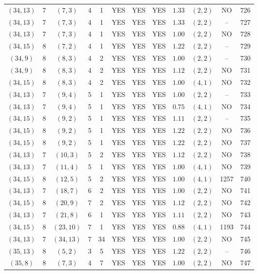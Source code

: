 \begin{longtable}{|c|c|c|c|c|c|c|c|c|c|c|c|}
$(34,13)$ & 7 & $(7,3)$ & 4 & 1 & YES & YES & YES & $1.33$ & $(2,2)$ & NO & 726\\
$(34,13)$ & 7 & $(7,3)$ & 4 & 1 & YES & YES & YES & $1.33$ & $(2,2)$ & -- & 727\\
$(34,13)$ & 7 & $(7,3)$ & 4 & 1 & YES & YES & YES & $1.00$ & $(2,2)$ & NO & 728\\
$(34,15)$ & 8 & $(7,2)$ & 4 & 1 & YES & YES & YES & $1.22$ & $(2,2)$ & -- & 729\\
$(34,9)$ & 8 & $(8,3)$ & 4 & 2 & YES & YES & YES & $1.00$ & $(2,2)$ & -- & 730\\
$(34,9)$ & 8 & $(8,3)$ & 4 & 2 & YES & YES & YES & $1.12$ & $(2,2)$ & NO & 731\\
$(34,15)$ & 8 & $(8,3)$ & 4 & 2 & YES & YES & YES & $1.00$ & $(4,1)$ & NO & 732\\
$(34,13)$ & 7 & $(9,4)$ & 5 & 1 & YES & YES & YES & $1.00$ & $(2,2)$ & -- & 733\\
$(34,13)$ & 7 & $(9,4)$ & 5 & 1 & YES & YES & YES & $0.75$ & $(4,1)$ & NO & 734\\
$(34,15)$ & 8 & $(9,2)$ & 5 & 1 & YES & YES & YES & $1.11$ & $(2,2)$ & -- & 735\\
$(34,15)$ & 8 & $(9,2)$ & 5 & 1 & YES & YES & YES & $1.22$ & $(2,2)$ & NO & 736\\
$(34,15)$ & 8 & $(9,2)$ & 5 & 1 & YES & YES & YES & $1.22$ & $(2,2)$ & NO & 737\\
$(34,13)$ & 7 & $(10,3)$ & 5 & 2 & YES & YES & YES & $1.12$ & $(2,2)$ & NO & 738\\
$(34,13)$ & 7 & $(11,4)$ & 5 & 1 & YES & YES & YES & $1.00$ & $(4,1)$ & NO & 739\\
$(34,15)$ & 8 & $(12,5)$ & 5 & 2 & YES & YES & YES & $1.00$ & $(4,1)$ & 1257 & 740\\
$(34,13)$ & 7 & $(18,7)$ & 6 & 2 & YES & YES & YES & $1.00$ & $(2,2)$ & NO & 741\\
$(34,15)$ & 8 & $(20,9)$ & 7 & 2 & YES & YES & YES & $1.12$ & $(2,2)$ & NO & 742\\
$(34,13)$ & 7 & $(21,8)$ & 6 & 1 & YES & YES & YES & $1.11$ & $(2,2)$ & NO & 743\\
$(34,15)$ & 8 & $(23,10)$ & 7 & 1 & YES & YES & YES & $0.88$ & $(4,1)$ & 1193 & 744\\
$(34,13)$ & 7 & $(34,13)$ & 7 & 34 & YES & YES & YES & $1.00$ & $(2,2)$ & NO & 745\\
$(35,13)$ & 8 & $(5,2)$ & 3 & 5 & YES & YES & YES & $1.22$ & $(2,2)$ & -- & 746\\
$(35,8)$ & 8 & $(7,3)$ & 4 & 7 & YES & YES & YES & $1.00$ & $(2,2)$ & NO & 747\\

\end{longtable}
